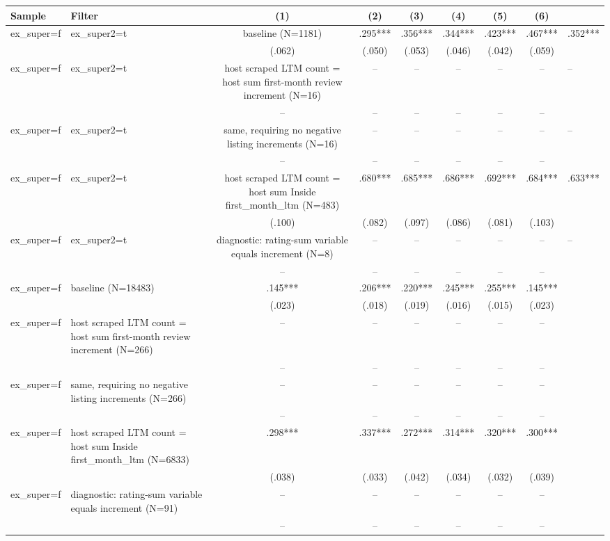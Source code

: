 \begin{tabular}{llcccccc}
\hline
Sample & Filter & (1) & (2) & (3) & (4) & (5) & (6) \\
\hline
ex_super=f & ex_super2=t & baseline (N=1181) & .295*** & .356*** & .344*** & .423*** & .467*** & .352***
\\
 &  & (.062) & (.050) & (.053) & (.046) & (.042) & (.059)
\\
ex_super=f & ex_super2=t & host scraped LTM count = host sum first-month review increment (N=16) & -- & -- & -- & -- & -- & --
\\
 &  & -- & -- & -- & -- & -- & --
\\
ex_super=f & ex_super2=t & same, requiring no negative listing increments (N=16) & -- & -- & -- & -- & -- & --
\\
 &  & -- & -- & -- & -- & -- & --
\\
ex_super=f & ex_super2=t & host scraped LTM count = host sum Inside first_month_ltm (N=483) & .680*** & .685*** & .686*** & .692*** & .684*** & .633***
\\
 &  & (.100) & (.082) & (.097) & (.086) & (.081) & (.103)
\\
ex_super=f & ex_super2=t & diagnostic: rating-sum variable equals increment (N=8) & -- & -- & -- & -- & -- & --
\\
 &  & -- & -- & -- & -- & -- & --
\\
ex_super=f & baseline (N=18483) & .145*** & .206*** & .220*** & .245*** & .255*** & .145***
\\
 &  & (.023) & (.018) & (.019) & (.016) & (.015) & (.023)
\\
ex_super=f & host scraped LTM count = host sum first-month review increment (N=266) & -- & -- & -- & -- & -- & --
\\
 &  & -- & -- & -- & -- & -- & --
\\
ex_super=f & same, requiring no negative listing increments (N=266) & -- & -- & -- & -- & -- & --
\\
 &  & -- & -- & -- & -- & -- & --
\\
ex_super=f & host scraped LTM count = host sum Inside first_month_ltm (N=6833) & .298*** & .337*** & .272*** & .314*** & .320*** & .300***
\\
 &  & (.038) & (.033) & (.042) & (.034) & (.032) & (.039)
\\
ex_super=f & diagnostic: rating-sum variable equals increment (N=91) & -- & -- & -- & -- & -- & --
\\
 &  & -- & -- & -- & -- & -- & --
\\
\hline
\end{tabular}
